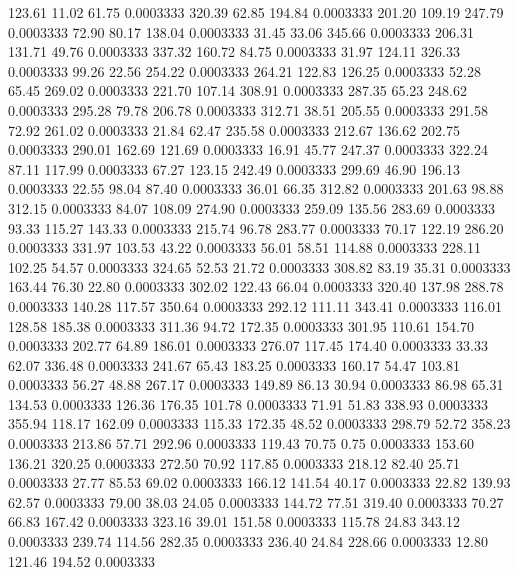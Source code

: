  123.61   11.02   61.75   0.0003333
 320.39   62.85  194.84   0.0003333
 201.20  109.19  247.79   0.0003333
  72.90   80.17  138.04   0.0003333
  31.45   33.06  345.66   0.0003333
 206.31  131.71   49.76   0.0003333
 337.32  160.72   84.75   0.0003333
  31.97  124.11  326.33   0.0003333
  99.26   22.56  254.22   0.0003333
 264.21  122.83  126.25   0.0003333
  52.28   65.45  269.02   0.0003333
 221.70  107.14  308.91   0.0003333
 287.35   65.23  248.62   0.0003333
 295.28   79.78  206.78   0.0003333
 312.71   38.51  205.55   0.0003333
 291.58   72.92  261.02   0.0003333
  21.84   62.47  235.58   0.0003333
 212.67  136.62  202.75   0.0003333
 290.01  162.69  121.69   0.0003333
  16.91   45.77  247.37   0.0003333
 322.24   87.11  117.99   0.0003333
  67.27  123.15  242.49   0.0003333
 299.69   46.90  196.13   0.0003333
  22.55   98.04   87.40   0.0003333
  36.01   66.35  312.82   0.0003333
 201.63   98.88  312.15   0.0003333
  84.07  108.09  274.90   0.0003333
 259.09  135.56  283.69   0.0003333
  93.33  115.27  143.33   0.0003333
 215.74   96.78  283.77   0.0003333
  70.17  122.19  286.20   0.0003333
 331.97  103.53   43.22   0.0003333
  56.01   58.51  114.88   0.0003333
 228.11  102.25   54.57   0.0003333
 324.65   52.53   21.72   0.0003333
 308.82   83.19   35.31   0.0003333
 163.44   76.30   22.80   0.0003333
 302.02  122.43   66.04   0.0003333
 320.40  137.98  288.78   0.0003333
 140.28  117.57  350.64   0.0003333
 292.12  111.11  343.41   0.0003333
 116.01  128.58  185.38   0.0003333
 311.36   94.72  172.35   0.0003333
 301.95  110.61  154.70   0.0003333
 202.77   64.89  186.01   0.0003333
 276.07  117.45  174.40   0.0003333
  33.33   62.07  336.48   0.0003333
 241.67   65.43  183.25   0.0003333
 160.17   54.47  103.81   0.0003333
  56.27   48.88  267.17   0.0003333
 149.89   86.13   30.94   0.0003333
  86.98   65.31  134.53   0.0003333
 126.36  176.35  101.78   0.0003333
  71.91   51.83  338.93   0.0003333
 355.94  118.17  162.09   0.0003333
 115.33  172.35   48.52   0.0003333
 298.79   52.72  358.23   0.0003333
 213.86   57.71  292.96   0.0003333
 119.43   70.75    0.75   0.0003333
 153.60  136.21  320.25   0.0003333
 272.50   70.92  117.85   0.0003333
 218.12   82.40   25.71   0.0003333
  27.77   85.53   69.02   0.0003333
 166.12  141.54   40.17   0.0003333
  22.82  139.93   62.57   0.0003333
  79.00   38.03   24.05   0.0003333
 144.72   77.51  319.40   0.0003333
  70.27   66.83  167.42   0.0003333
 323.16   39.01  151.58   0.0003333
 115.78   24.83  343.12   0.0003333
 239.74  114.56  282.35   0.0003333
 236.40   24.84  228.66   0.0003333
  12.80  121.46  194.52   0.0003333
